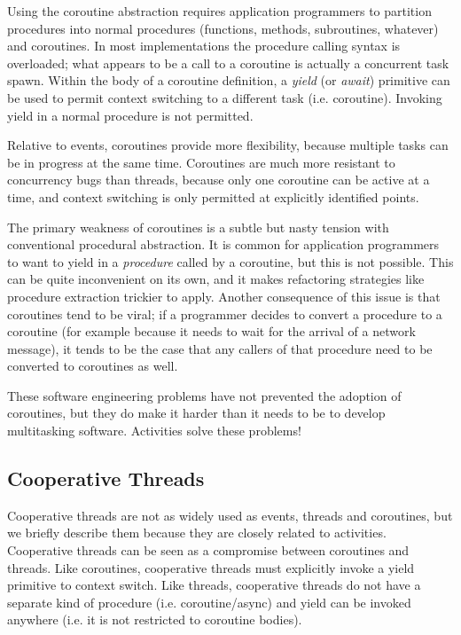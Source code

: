 \documentclass[10pt,preprint]{sigplanconf}
\begin{document}
Using the coroutine abstraction requires application programmers to partition procedures into normal procedures (functions, methods, subroutines, whatever) and coroutines.
In most implementations the procedure calling syntax is overloaded; what appears to be a call to a coroutine is actually a concurrent task spawn.
Within the body of a coroutine definition, a \emph{yield} (or \emph{await}) primitive can be used to permit context switching to a different task (i.e. coroutine).
Invoking yield in a normal procedure is not permitted.

Relative to events, coroutines provide more flexibility, because multiple tasks can be in progress at the same time.
Coroutines are much more resistant to concurrency bugs than threads, because only one coroutine can be active at a time, and context switching is only permitted at explicitly identified points.

The primary weakness of coroutines is a subtle but nasty tension with conventional procedural abstraction.
It is common for application programmers to want to yield in a \emph{procedure} called by a coroutine, but this is not possible.
This can be quite inconvenient on its own, and it makes refactoring strategies like procedure extraction trickier to apply.
Another consequence of this issue is that coroutines tend to be viral; if a programmer decides to convert a procedure to a coroutine (for example because it needs to wait for the arrival of a network message), it tends to be the case that any callers of that procedure need to be converted to coroutines as well.



These software engineering problems have not prevented the adoption of coroutines, but they do make it harder than it needs to be to develop multitasking software.
Activities solve these problems!

\subsection{Cooperative Threads}

Cooperative threads are not as widely used as events, threads and coroutines, but we briefly describe them because they are closely related to activities.
Cooperative threads can be seen as a compromise between coroutines and threads.
Like coroutines, cooperative threads must explicitly invoke a yield primitive to context switch.
Like threads, cooperative threads do not have a separate kind of procedure (i.e. coroutine/async) and yield can be invoked anywhere (i.e. it is not restricted to coroutine bodies).
\end{document}
